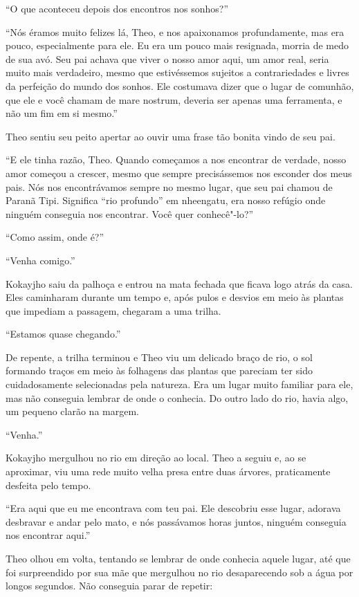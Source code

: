 ``O que aconteceu depois dos encontros nos sonhos?''

``Nós éramos muito felizes lá, Theo, e nos apaixonamos profundamente,
mas era pouco, especialmente para ele. Eu era um pouco mais resignada,
morria de medo de sua avó. Seu pai achava que viver o nosso amor aqui,
um amor real, seria muito mais verdadeiro, mesmo que estivéssemos
sujeitos a contrariedades e livres da perfeição do mundo dos sonhos. Ele
costumava dizer que o lugar de comunhão, que ele e você chamam de mare
nostrum, deveria ser apenas uma ferramenta, e não um fim em si mesmo.''

Theo sentiu seu peito apertar ao ouvir uma frase tão bonita vindo de seu
pai.

``E ele tinha razão, Theo. Quando começamos a nos encontrar de verdade,
nosso amor começou a crescer, mesmo que sempre precisássemos nos
esconder dos meus pais. Nós nos encontrávamos sempre no mesmo lugar, que seu
pai chamou de Paranã Tipi. Significa ``rio profundo'' em nheengatu, era nosso refúgio onde ninguém conseguia nos encontrar. Você quer conhecê"-lo?''

``Como assim, onde é?''

``Venha comigo.''

Kokayjho saiu da palhoça e entrou na mata fechada que ficava logo atrás
da casa. Eles caminharam durante um tempo e, após pulos e desvios em
meio às plantas que impediam a passagem, chegaram a uma trilha.

``Estamos quase chegando.''

De repente, a trilha terminou e Theo viu um delicado braço de rio, o sol
formando traços em meio às folhagens das plantas que pareciam ter sido
cuidadosamente selecionadas pela natureza. Era um lugar muito familiar
para ele, mas não conseguia lembrar de onde o conhecia. Do outro lado do
rio, havia algo, um pequeno clarão na margem.

``Venha.''

Kokayjho mergulhou no rio em direção ao local. Theo a seguiu e, ao se
aproximar, viu uma rede muito velha presa entre duas árvores,
praticamente desfeita pelo tempo.

``Era aqui que eu me encontrava com teu pai. Ele descobriu esse lugar,
adorava desbravar e andar pelo mato, e nós passávamos horas juntos, ninguém
conseguia nos encontrar aqui.''

Theo olhou em volta, tentando se lembrar de onde conhecia aquele lugar,
até que foi surpreendido por sua mãe que mergulhou no rio desaparecendo
sob a água por longos segundos. Não conseguia parar de repetir:

